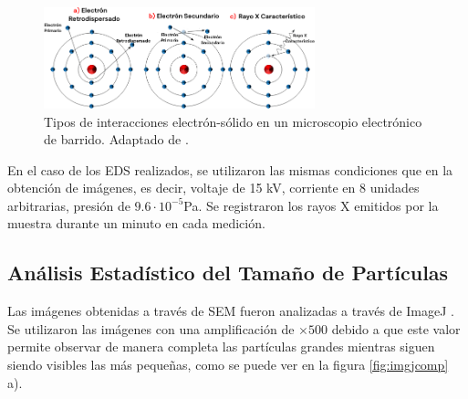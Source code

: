\documentclass[../main.tex]{subfiles}
\begin{document}
\begin{figure}[H]
    \centering
    \includegraphics[width=0.7\textwidth]{fig/semtipos.png}
    \caption{Tipos de interacciones electrón-sólido en un microscopio electrónico de barrido. Adaptado de \cite{Jensen2022}.}
    \label{semtipos}
\end{figure}
En el caso de los EDS realizados, se utilizaron las mismas condiciones que en la obtención de imágenes, es decir, voltaje de 15 kV, corriente en 8 unidades arbitrarias, presión de $9.6\cdot10^{-5}$Pa. Se registraron los rayos X emitidos por la muestra durante un minuto en cada medición.
\subsection{Análisis Estadístico del Tamaño de Partículas} \label{sec:analisisestadistico}
Las imágenes obtenidas a través de SEM fueron analizadas a través de ImageJ \cite{ImageJ}. Se utilizaron las imágenes con una amplificación de $\times500$ debido a que este valor permite observar de manera completa las partículas grandes mientras siguen siendo visibles las más pequeñas, como se puede ver en la figura \ref{fig:imgjcomp} a).
\end{document}
